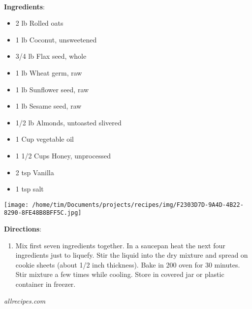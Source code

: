 \documentclass[11pt, twoside, openany]{book}
\begin{document}
 \label{honey-crunch-cerael}\hfill\textit{}\\
\begin{minipage}[t]{0.8\linewidth}
\textbf{Ingredients}:\vspace{-3mm}
\begin{multicols}{2}
\begin{itemize}\setlength\itemsep{-1mm}
\item 2 lb Rolled oats
\item 1 lb Coconut, unsweetened
\item 3/4 lb Flax seed, whole
\item 1 lb Wheat germ, raw
\item 1 lb Sunflower seed, raw
\item 1 lb Sesame seed, raw
\item 1/2 lb Almonds, untoasted slivered
\item 1 Cup vegetable oil
\item 1 1/2 Cups Honey, unprocessed
\item 2 tsp Vanilla
\item 1 tsp salt
\end{itemize}
\end{multicols}
\end{minipage}
\begin{minipage}[t]{0.2\linewidth}
\centering \strut\vspace*{-\baselineskip}\newline
\texttt{[image: /home/tim/Documents/projects/recipes/img/F2303D7D-9A4D-4B22-8290-8FE48B8BFF5C.jpg]}\\
\end{minipage}\vspace{3mm}
\textbf{Directions}:
\vspace{-3mm}\begin{enumerate}\setlength\itemsep{-1mm}
\item Mix first seven ingredients together. In a saucepan heat the next four ingredients just to liquefy. Stir the liquid into the dry mixture and spread on cookie sheets (about 1/2 inch thickness). Bake in 200 oven for 30 minutes. Stir mixture a few times while cooling. Store in covered jar or plastic container in freezer.
\end{enumerate}
 \label{seared-chicken-with-avocado}\hfill\textit{allrecipes.com}\\
\end{document}
